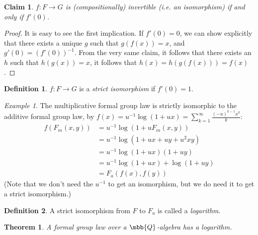 \documentclass{article}
\newtheorem*{theorem*}{Theorem}
\newtheorem*{claim*}{Claim}
\theoremstyle{definition}
\newtheorem*{definition*}{Definition}
\theoremstyle{remark}
\newtheorem*{example*}{Example}
\begin{document}
	\begin{claim*}
		$f: F \to G$ is (compositionally) invertible (i.e. an isomorphism) if and only if $f'\left(0\right)$.
	\end{claim*}
	
	\begin{proof}
		It is easy to see the first implication.
		If $f'\left(0\right) = 0$, we can show explicitly that there exists a unique $g$ such that $g\left(f\left(x\right)\right) = x$, and $g'\left(0\right) = \left(f'\left(0\right)\right)^{-1}$. From the very same claim, it follows that there exists an $h$ such that $h\left(g\left(x\right)\right) = x$, it follows that $h\left(x\right) = h\left(g\left(f\left(x\right)\right)\right) = f\left(x\right)$.
	\end{proof}

	\begin{definition*}
		$f: F \to G$ is a \emph{strict isomorphism} if $f'\left(0\right)=1$.
	\end{definition*}

	\begin{example*}
		The multiplicative formal group law is strictly isomorphic to the additive formal group law,
		by $f\left(x\right) = u^{-1} \log \left(1+ux\right) = \sum_{k=1}^{\infty} \frac{\left(-u\right)^{k-1} x^k}{k}$:
		\begin{align*}
			f\left(F_m\left(x,y\right)\right)
			&= u^{-1} \log \left(1+u F_m\left(x,y\right)\right)\\
			&= u^{-1} \log \left(1+ux+uy+u^2 xy\right)\\
			&= u^{-1} \log \left(1+ux\right)\left(1+uy\right)\\
			&= u^{-1} \log \left(1+ux\right) + \log \left(1+uy\right)\\
			&= F_a\left(f\left(x\right), f\left(y\right)\right)
		\end{align*}
		(Note that we don't need the $u^{-1}$ to get an isomorphism, but we do need it to get a strict isomorphism.)
	\end{example*}

	\begin{definition*}
		A strict isomorphism from $F$ to $F_a$ is called a \emph{logarithm}.
	\end{definition*}

	\begin{theorem*}
		A formal group law over a $\mbb{Q}$-algebra has a logarithm.
	\end{theorem*}
\end{document}
